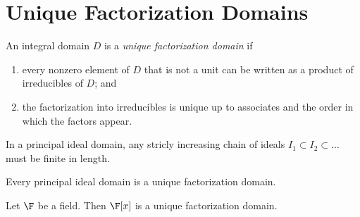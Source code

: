 \section{Unique Factorization Domains}

\begin{definition}
	An integral domain $D$ is a \textit{unique factorization domain} if
	\begin{enumerate}
		\item every nonzero element of $D$ that is not a unit can be written as a product of irreducibles of $D$; and
		\item the factorization into irreducibles is unique up to associates and the order in which the factors appear.
	\end{enumerate}
\end{definition}

\begin{lemma}
	In a principal ideal domain, any stricly increasing chain of ideals $I_1 \subset I_2 \subset \dots$ must be finite in length.
\end{lemma}

\begin{theorem}
	Every principal ideal domain is a unique factorization domain.
\end{theorem}

\begin{corollary}
	Let $\F$ be a field. Then $\F[x]$ is a unique factorization domain.
\end{corollary}
